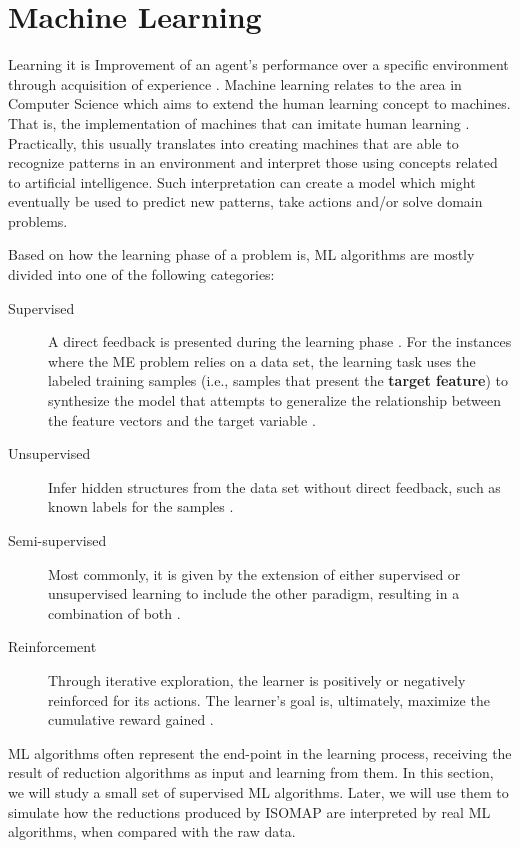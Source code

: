 \clearpage
\section{Machine Learning}
Learning it is Improvement of an agent's performance over a specific environment through acquisition of experience \cite{pat1996}. Machine learning relates to the area in Computer Science which aims to extend the human learning concept to machines. That is, the implementation of machines that can imitate human learning \cite{hot2009}. Practically, this usually translates into creating machines that are able to recognize patterns in an environment and interpret those using concepts related to artificial intelligence. Such interpretation can create a model which might eventually be used to predict new patterns, take actions and/or solve domain problems.

Based on how the learning phase of a problem is, ML algorithms are mostly divided into one of the following categories:

\begin{description}
	\item[Supervised] A direct feedback is presented during the learning phase \cite{pat1996}. For the instances where the ME problem relies on a data set, the learning task uses the labeled training samples (i.e., samples that present the \textbf{target feature}) to synthesize the model that attempts to generalize the relationship between the feature vectors and the target variable \cite{awa2015}.
	
	\item[Unsupervised] Infer hidden structures from the data set without direct feedback, such as known labels for the samples \cite{awa2015}.
	
	\item[Semi-supervised] Most commonly, it is given by the extension of either supervised or unsupervised learning to include the other paradigm, resulting in a combination of both \cite{zhu2009}.
	
	\item[Reinforcement] Through iterative exploration, the learner is positively or negatively reinforced for its actions. The learner's goal is, ultimately, maximize the cumulative reward gained \cite{awa2015}.
\end{description}

ML algorithms often represent the end-point in the learning process, receiving the result of reduction algorithms as input and learning from them. In this section, we will study a small set of supervised ML algorithms. Later, we will use them to simulate how the reductions produced by ISOMAP are interpreted by real ML algorithms, when compared with the raw data.

